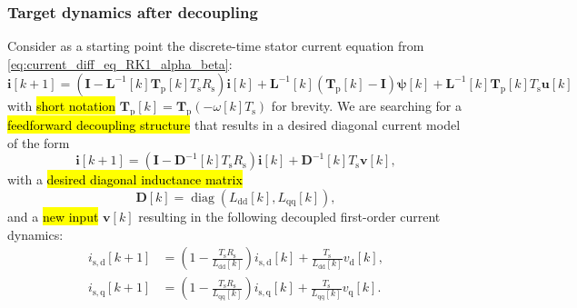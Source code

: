\begin{frame}
    \frametitle{Target dynamics after decoupling}
    Consider as a starting point the discrete-time stator current equation from \eqref{eq:current_diff_eq_RK1_alpha_beta}:
    \begin{equation*}
        \bm{i}[k+1]=\left(\bm{I}-\bm{L}^{-1}[k]\bm{T}_\mathrm{p}[k]T_\mathrm{s}R_\mathrm{s}\right)\bm{i}[k]
        +\bm{L}^{-1}[k](\bm{T}_\mathrm{p}[k]-\bm{I})\bm{\psi}[k]
        +\bm{L}^{-1}[k]\bm{T}_\mathrm{p}[k]T_\mathrm{s}\bm{u}[k]
    \end{equation*}
    with \hl{short notation} $\bm{T}_\mathrm{p}[k] = \bm{T}_\mathrm{p}(-\omega[k]T_\mathrm{s})$ for brevity. \pause We are searching for a \hl{feedforward decoupling structure} that results in a desired diagonal current model of the form
    \begin{equation}
        \bm{i}[k+1]=\left(\bm{I}-\bm{D}^{-1}[k]T_\mathrm{s}R_\mathrm{s}\right)\bm{i}[k]+\bm{D}^{-1}[k]T_\mathrm{s}\bm{v}[k],
        \label{eq:target_diag_model_addendum}
    \end{equation}\pause%
    with a \hl{desired diagonal inductance matrix}
    \begin{equation}
        \bm{D}[k]=\operatorname{diag}\left(L_{\mathrm{dd}}[k],L_{\mathrm{qq}}[k]\right),
    \end{equation}\pause%
    and a \hl{new input} $\bm{v}[k]$ resulting in the following decoupled first-order current dynamics:
    \begin{equation}
        \begin{split}
            i_\mathrm{s,d}[k+1] & =\left(1-\frac{T_\mathrm{s}R_\mathrm{s}}{L_{\mathrm{dd}}[k]}\right)i_\mathrm{s,d}[k]+\frac{T_\mathrm{s}}{L_{\mathrm{dd}}[k]}v_\mathrm{d}[k], \\
            i_\mathrm{s,q}[k+1] & =\left(1-\frac{T_\mathrm{s}R_\mathrm{s}}{L_{\mathrm{qq}}[k]}\right)i_\mathrm{s,q}[k]+\frac{T_\mathrm{s}}{L_{\mathrm{qq}}[k]}v_\mathrm{q}[k].
        \end{split}
    \end{equation}
\end{frame}

